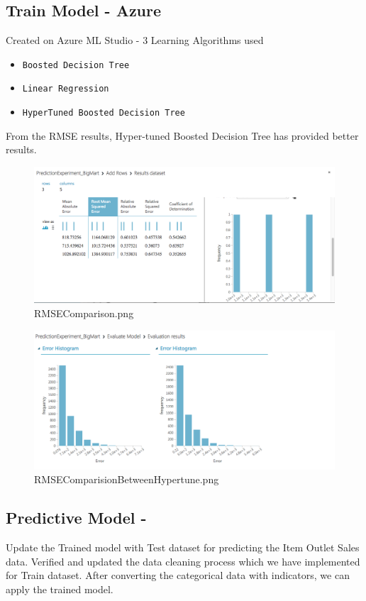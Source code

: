 \subsection{Train Model - Azure}
Created on Azure ML Studio - 3 Learning Algorithms used
\begin{itemize}
\item \verb|Boosted Decision Tree|
\item \verb|Linear Regression|
\item \verb|HyperTuned Boosted Decision Tree|
\end{itemize}

From the RMSE results, Hyper-tuned Boosted Decision Tree has provided better results.

\begin{figure}[pic3]
	\centering\includegraphics[width=\columnwidth]{Images/mlstudio/RMSEComparison.png}
	\caption{RMSEComparison.png}\label{fig:RMSEComparison}
\end{figure}

\begin{figure}[pic4]
	\centering\includegraphics[width=\columnwidth]{Images/mlstudio/RMSEComparisionBetweenHypertune.png}
	\caption{RMSEComparisionBetweenHypertune.png}\label{fig:RMSEComparisionBetweenHypertune}
\end{figure}

\subsection{Predictive Model -}
Update the Trained model with Test dataset for predicting the Item Outlet Sales data. 
Verified and updated the data cleaning process which we have implemented for Train dataset. 
After converting the categorical data with indicators, we can apply the trained model.

